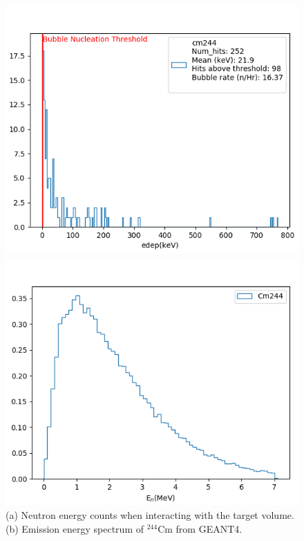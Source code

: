 \documentclass[%
12pt,
twoside,
reprint,
amsmath,amssymb,
aps,
]{article}
\begin{document}
	\pagebreak
	\begin{figure}[!t]
		\begin{minipage}{0.5\textwidth}
			\centering
			\includegraphics[width=1.02\linewidth]{Images/cm244_normalized_cropped.png}
		\end{minipage}
		\begin{minipage}{0.5\textwidth}
			\centering
			\includegraphics[width=1.02\linewidth]{Images/cm244_spectrum_cropped.png}
		\end{minipage}
		\caption{\label{tab:table-name} (a) Neutron energy counts when interacting with the target volume. (b) Emission energy spectrum of $^{244}$Cm from GEANT4.}%
	\end{figure}
\end{document}
